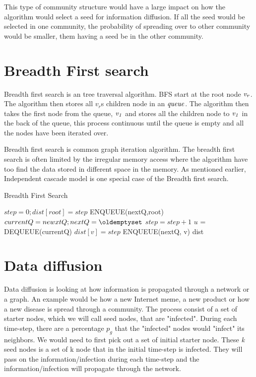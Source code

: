 This type of community structure would have a large impact on how the algorithm would select a seed for information diffusion. If all the seed would be selected in one community, the probability of spreading over to other community would be smaller, them having a seed be in the other community.

\section{Breadth First search}
Breadth first search is an tree traversal algorithm. BFS start at the root node $\it{v_r}$. The algorithm then stores all $v_r$s children node in an $\it{queue}$. The algorithm then takes the first node from the queue, $\it{v_1}$ and stores all the children node to $\it{v_1}$ in the back of the queue, this process continuous until the queue is empty and all the nodes have been iterated over. 

Breadth first search is common graph iteration algorithm. The breadth first search is often limited by the irregular memory access where the algorithm have too find the data stored in different space in the memory. As mentioned earlier, Independent cascade model is one special case of the Breadth first search.

\begin{algorithm}
\caption{Breadth First Search}
\begin{algorithmic}[1]
\State $step = 0; dist[root] = step$
\State ENQUEUE(nextQ,root)
\State $currentQ = newxtQ; nextQ = \oldemptyset$
\State $step = step+1$
\State$ u$ = DEQUEUE(currentQ)
\State $dist[v] = step$
\State ENQUEUE(nextQ, v)
\EndIf
\EndFor
\EndWhile
\EndWhile
\Return dist
\end{algorithmic}
\end{algorithm}


\section{Data diffusion}
Data diffusion is looking at how information is propagated through a network or a graph. An example would be how a new Internet meme, a new product or how a new disease is spread through a community. The process consist of a set of starter nodes, which we will call seed nodes, that are "infected". During each time-step, there are a percentage $p_g$ that the "infected" nodes would "infect" its neighbors. We would need to first pick out a set of initial starter node. These {\it k} seed nodes is a set of k node that in the initial time-step is infected. They will pass on the information/infection during each time-step and the information/infection will propagate through the network. 
 
